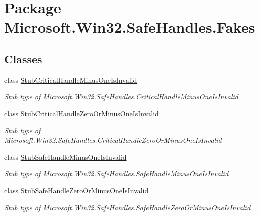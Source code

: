 \hypertarget{namespace_microsoft_1_1_win32_1_1_safe_handles_1_1_fakes}{\section{Package Microsoft.\-Win32.\-Safe\-Handles.\-Fakes}
\label{namespace_microsoft_1_1_win32_1_1_safe_handles_1_1_fakes}
}
\subsection*{Classes}
\begin{DoxyCompactItemize}
\item 
class \hyperlink{class_microsoft_1_1_win32_1_1_safe_handles_1_1_fakes_1_1_stub_critical_handle_minus_one_is_invalid}{Stub\-Critical\-Handle\-Minus\-One\-Is\-Invalid}
\begin{DoxyCompactList}\small\item\em Stub type of Microsoft.\-Win32.\-Safe\-Handles.\-Critical\-Handle\-Minus\-One\-Is\-Invalid\end{DoxyCompactList}\item 
class \hyperlink{class_microsoft_1_1_win32_1_1_safe_handles_1_1_fakes_1_1_stub_critical_handle_zero_or_minus_one_is_invalid}{Stub\-Critical\-Handle\-Zero\-Or\-Minus\-One\-Is\-Invalid}
\begin{DoxyCompactList}\small\item\em Stub type of Microsoft.\-Win32.\-Safe\-Handles.\-Critical\-Handle\-Zero\-Or\-Minus\-One\-Is\-Invalid\end{DoxyCompactList}\item 
class \hyperlink{class_microsoft_1_1_win32_1_1_safe_handles_1_1_fakes_1_1_stub_safe_handle_minus_one_is_invalid}{Stub\-Safe\-Handle\-Minus\-One\-Is\-Invalid}
\begin{DoxyCompactList}\small\item\em Stub type of Microsoft.\-Win32.\-Safe\-Handles.\-Safe\-Handle\-Minus\-One\-Is\-Invalid\end{DoxyCompactList}\item 
class \hyperlink{class_microsoft_1_1_win32_1_1_safe_handles_1_1_fakes_1_1_stub_safe_handle_zero_or_minus_one_is_invalid}{Stub\-Safe\-Handle\-Zero\-Or\-Minus\-One\-Is\-Invalid}
\begin{DoxyCompactList}\small\item\em Stub type of Microsoft.\-Win32.\-Safe\-Handles.\-Safe\-Handle\-Zero\-Or\-Minus\-One\-Is\-Invalid\end{DoxyCompactList}\end{DoxyCompactItemize}

